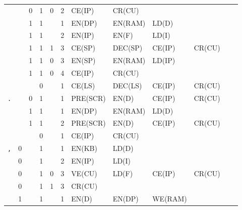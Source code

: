 \begin{landscape}
\begin{longtable}[c] {c|cccc|c|llllll}
    \rowcolor{Gray}               &   & 0 & 1     & 0    & 2     & CE(IP)   & CR(CU)   &         &        &        &        \\
    \rowcolor{White}              &   & 1 & 1     &      & 1     & EN(DP)   & EN(RAM)  & LD(D)   &        &        &        \\
    \rowcolor{White}              &   & 1 & 1     &      & 2     & EN(IP)   & EN(F)    & LD(I)   &        &        &        \\
    \rowcolor{White}              &   & 1 & 1     & 1    & 3     & CE(SP)   & DEC(SP)  & CE(IP)  & CR(CU) &        &        \\
    \rowcolor{Gray}               &   & 1 & 1     & 0    & 3     & EN(SP)   & EN(RAM)  & LD(IP)  &        &        &        \\
    \rowcolor{Gray}               &   & 1 & 1     & 0    & 4     & CE(IP)   & CR(CU)   &         &        &        &        \\
    \rowcolor{White}              &   &   & 0     &      & 1     & CE(LS)   & DEC(LS)  & CE(IP)  & CR(CU) &        &        \\ \hline
    \rowcolor{Gray}  \texttt{.}   &   & 0 & 1     &      & 1     & PRE(SCR) & EN(D)    & CE(IP)  & CR(CU) &        &        \\
    \rowcolor{White}              &   & 1 & 1     &      & 1     & EN(DP)   & EN(RAM)  & LD(D)   &        &        &        \\
    \rowcolor{White}              &   & 1 & 1     &      & 2     & PRE(SCR) & EN(D)    & CE(IP)  & CR(CU) &        &        \\
    \rowcolor{Gray}               &   &   & 0     &      & 1     & CE(IP)   & CR(CU)   &         &        &        &        \\ \hline
    \rowcolor{White} \texttt{,}   & 0 &   & 1     &      & 1     & EN(KB)   & LD(D)    &         &        &        &        \\
    \rowcolor{White}              & 0 &   & 1     &      & 2     & EN(IP)   & LD(I)    &         &        &        &        \\
    \rowcolor{White}              & 0 &   & 1     & 0    & 3     & VE(CU)   & LD(F)    & CE(IP)  & CR(CU) &        &        \\
    \rowcolor{Gray}               & 0 &   & 1     & 1    & 3     & CR(CU)   &          &         &        &        &        \\   
    \rowcolor{White}              & 1 &   & 1     &      & 1     & EN(D)    & EN(DP)   & WE(RAM) &        &        &        \\       

\end{longtable}
\end{landscape}
